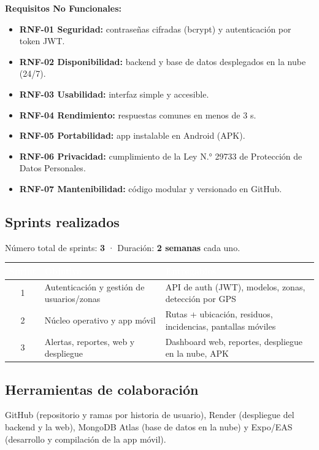 \documentclass[11pt,a4paper]{article}
\newcommand{\theadcell}[1]{%
  \cellcolor{azuloscuro}\textcolor{white}{\textbf{\small #1}}}
\begin{document}
\textbf{Requisitos No Funcionales:}
\begin{itemize}[leftmargin=*]
    \item \textbf{RNF-01 Seguridad:} contraseñas cifradas (bcrypt) y autenticación por token JWT.
    \item \textbf{RNF-02 Disponibilidad:} backend y base de datos desplegados en la nube (24/7).
    \item \textbf{RNF-03 Usabilidad:} interfaz simple y accesible.
    \item \textbf{RNF-04 Rendimiento:} respuestas comunes en menos de 3 s.
    \item \textbf{RNF-05 Portabilidad:} app instalable en Android (APK).
    \item \textbf{RNF-06 Privacidad:} cumplimiento de la Ley N.° 29733 de Protección de Datos Personales.
    \item \textbf{RNF-07 Mantenibilidad:} código modular y versionado en GitHub.
\end{itemize}

\subsection{Sprints realizados}
Número total de sprints: \textbf{3} · Duración: \textbf{2 semanas} cada uno.
\begin{table}[H]
\centering
\renewcommand{\arraystretch}{1.3}
\begin{tabularx}{\textwidth}{|c|X|X|}
\hline
\theadcell{Sprint} & \theadcell{Objetivo} & \theadcell{Entregables} \\
\hline
1 & Autenticación y gestión de usuarios/zonas & API de auth (JWT), modelos, zonas, detección por GPS \\
\hline
2 & Núcleo operativo y app móvil & Rutas + ubicación, residuos, incidencias, pantallas móviles \\
\hline
3 & Alertas, reportes, web y despliegue & Dashboard web, reportes, despliegue en la nube, APK \\
\hline
\end{tabularx}
\end{table}

\subsection{Herramientas de colaboración}
GitHub (repositorio y ramas por historia de usuario), Render (despliegue del backend y la web), MongoDB Atlas (base de datos en la nube) y Expo/EAS (desarrollo y compilación de la app móvil).
\end{document}
